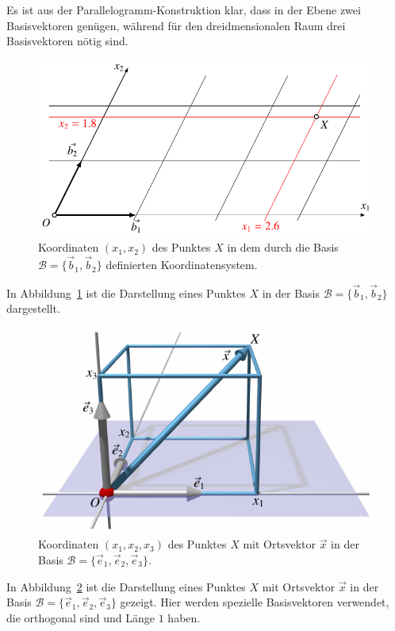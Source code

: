 Es ist aus der Parallelogramm-Konstruktion klar, dass in der Ebene zwei 
Basisvektoren genügen, während für den dreidmensionalen Raum drei
Basisvektoren nötig sind.
\begin{figure}
\centering
\includegraphics{3/images/coord2d.pdf}
\caption{Koordinaten $(x_1,x_2)$ des Punktes $X$ in dem durch die
Basis  $\mathcal{B}=\{\vec{b}_1,\vec{b}_2\}$ definierten Koordinatensystem.
\label{skript:affin:coord2d}}
\end{figure}
In Abbildung~\ref{skript:affin:coord2d} ist die Darstellung eines Punktes
$X$ in der Basis $\mathcal{B}=\{\vec{b}_1,\vec{b}_2\}$ dargestellt.
\begin{figure}
\centering
\includegraphics{3/images/coordsystem.pdf}
\caption{Koordinaten $(x_1,x_2,x_3)$ des Punktes $X$ mit Ortsvektor $\vec{x}$
in der Basis $\mathcal{B}=\{\vec{e}_1,\vec{e}_2,\vec{e}_3\}$.
\label{skript:affin:coordsystem}}
\end{figure}
In Abbildung~\ref{skript:affin:coordsystem} ist die Darstellung eines Punktes
$X$ mit Ortsvektor $\vec{x}$ in der Basis
$\mathcal{B}=\{\vec{e}_1,\vec{e}_2,\vec{e}_3\}$
gezeigt.
Hier werden spezielle Basisvektoren verwendet, die orthogonal sind und Länge
$1$ haben.


